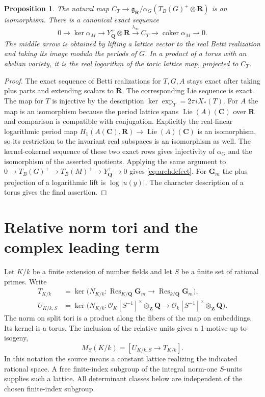 \documentclass[11pt]{amsart}
\numberwithin{equation}{section}
\newtheorem{proposition}[theorem]{Proposition}
\theoremstyle{definition}
\theoremstyle{remark}
\newcommand{\Q}{\mathbf Q}
\newcommand{\Z}{\mathbf Z}
\newcommand{\R}{\mathbf R}
\newcommand{\C}{\mathbf C}
\newcommand{\Gm}{\mathbf G_m}
\newcommand{\OO}{\mathcal O}
\newcommand{\Res}{\operatorname{Res}}
\newcommand{\Lie}{\operatorname{Lie}}
\newcommand{\coker}{\operatorname{coker}}
\begin{document}
\begin{proposition}\label{prop:realdefect}
The natural map $C_T\to
\mathfrak g_\R/\alpha_G(T_B(G)^+\otimes\R)$ is an isomorphism.
There is a canonical exact sequence
\begin{equation}\label{eq:archdefect}
 0\to\ker\alpha_M\to Y_\Q^+\otimes\R
 \xrightarrow{\lambda_\infty} C_T
 \to\coker\alpha_M\to0 .
\end{equation}
The middle arrow is obtained by lifting a lattice vector to
the real Betti realization and taking its image modulo the
periods of $G$. In a product of a torus with an abelian variety,
it is the real logarithm of the toric lattice map, projected
to $C_T$.
\end{proposition}

\begin{proof}
The exact sequence of Betti realizations for $T,G,A$ stays
exact after taking plus parts and extending scalars to $\R$.
The corresponding Lie sequence is exact. The map for $T$ is
injective by the description $\ker\exp_T=2\pi iX_*(T)$.
For $A$ the map is an isomorphism because the period lattice
spans $\Lie(A)(\C)$ over $\R$ and comparison is compatible
with conjugation. Explicitly the real-linear logarithmic period map
$H_1(A(\C),\R)\to\Lie(A)(\C)$ is an isomorphism, so its restriction
to the invariant real subspaces is an isomorphism as well. The kernel-cokernel sequence of these
two exact rows gives injectivity of $\alpha_G$ and the
isomorphism of the asserted quotients. Applying the same
argument to $0\to T_B(G)^+\to T_B(M)^+\to Y_\Q^+\to0$
gives \eqref{eq:archdefect}. For $\Gm$ the plus projection
of a logarithmic lift is $\log|u(y)|$. The character
description of a torus gives the final assertion.
\end{proof}

\section{Relative norm tori and the complex leading term}
\label{sec:complex}

Let $K/k$ be a finite extension of number fields and let $S$
be a finite set of rational primes. Write
\begin{align*}
 T_{K/k}
 &=\ker\bigl(N_{K/k}:\Res_{K/\Q}\Gm\to\Res_{k/\Q}\Gm\bigr),\\
 U_{K/k,S}
 &=\ker\bigl(N_{K/k}:
 \OO_K[S^{-1}]^\times\otimes_\Z\Q\to
 \OO_k[S^{-1}]^\times\otimes_\Z\Q\bigr).
\end{align*}
The norm on split tori is a product along the fibers of the
map on embeddings. Its kernel is a torus. The inclusion
of the relative units gives a 1-motive up to isogeny,
\[
 M_S(K/k)=[U_{K/k,S}\longrightarrow T_{K/k}].
\]
In this notation the source means a constant lattice realizing
the indicated rational space. A free finite-index subgroup
of the integral norm-one $S$-units supplies such a lattice.
All determinant classes below are independent of the chosen
finite-index subgroup.
\end{document}
